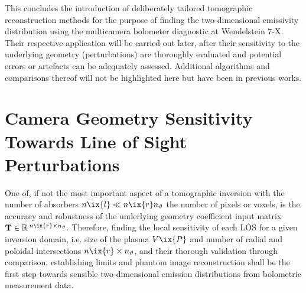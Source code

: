 %
        This concludes the introduction of deliberately tailored tomographic reconstruction methods for the purpose of finding the two-dimensional emissivity distribution using the multicamera bolometer diagnostic at Wendelstein 7-X. Their respective application will be carried out later, after their sensitivity to the underlying geometry (perturbations) are thoroughly evaluated and potential errors or artefacts can be adequately assessed. Additional algorithms and comparisons thereof will not be highlighted here but have been in previous works\cite{Anton1996,Giannone1997,Li2021}.%
%
    \section{Camera Geometry Sensitivity Towards Line of Sight Perturbations}\label{sec:geomimpact}%
%
        One of, if not the most important aspect of a tomographic inversion with the number of absorbers $n\ix{l}\ll n\ix{r}n_{\text{$\vartheta$}}$ the number of pixels or voxels, is the accuracy and robustness of the underlying geometry coefficient input matrix $\mathbf{T}\in\mathbb{R}\,^{n\ix{r}\times n_{\text{$\vartheta$}}}$. Therefore, finding the local sensitivity of each LOS for a given inversion domain, i.e. size of the plasma $V\ix{P}$ and number of radial and poloidal intersections $n\ix{r}\times n_{\text{$\vartheta$}}$, and their thorough validation through comparison, establishing limits and phantom image reconstruction shall be the first step towards sensible two-dimensional emission distributions from bolometric measurement data.\\%
